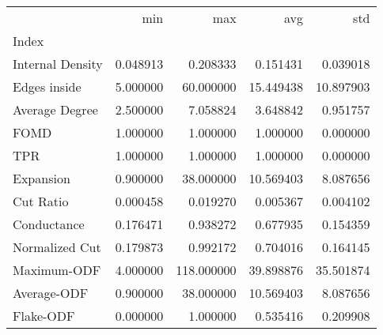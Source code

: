\begin{tabular}{lrrrr}
\toprule
{} &       min &         max &        avg &        std \\
Index            &           &             &            &            \\
\midrule
Internal Density &  0.048913 &    0.208333 &   0.151431 &   0.039018 \\
Edges inside     &  5.000000 &   60.000000 &  15.449438 &  10.897903 \\
Average Degree   &  2.500000 &    7.058824 &   3.648842 &   0.951757 \\
FOMD             &  1.000000 &    1.000000 &   1.000000 &   0.000000 \\
TPR              &  1.000000 &    1.000000 &   1.000000 &   0.000000 \\
Expansion        &  0.900000 &   38.000000 &  10.569403 &   8.087656 \\
Cut Ratio        &  0.000458 &    0.019270 &   0.005367 &   0.004102 \\
Conductance      &  0.176471 &    0.938272 &   0.677935 &   0.154359 \\
Normalized Cut   &  0.179873 &    0.992172 &   0.704016 &   0.164145 \\
Maximum-ODF      &  4.000000 &  118.000000 &  39.898876 &  35.501874 \\
Average-ODF      &  0.900000 &   38.000000 &  10.569403 &   8.087656 \\
Flake-ODF        &  0.000000 &    1.000000 &   0.535416 &   0.209908 \\
\bottomrule
\end{tabular}
